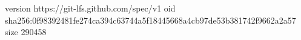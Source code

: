 version https://git-lfs.github.com/spec/v1
oid sha256:0f98392481fe274ca394c63744a5f18445668a4cb97de53b381742f9662a2a57
size 290458
